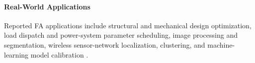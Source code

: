 \paragraph{Real-World Applications}
Reported FA applications include structural and mechanical design optimization, load dispatch and power-system parameter scheduling, image processing and segmentation, wireless sensor-network localization, clustering, and machine-learning model calibration \autocite{YangHe2013}.
